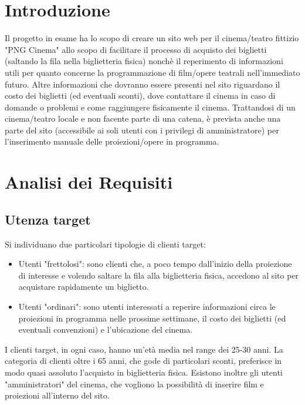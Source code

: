 \documentclass[a4paper, 12pt]{article}
\begin{document}
\makefrontpage
\tableofcontents
\clearpage

\section{Introduzione}
Il progetto in esame ha lo scopo di creare un sito web per il cinema/teatro fittizio "PNG Cinema" allo scopo di facilitare il processo di acquisto dei biglietti (saltando la fila nella biglietteria fisica) nonchè
il reperimento di informazioni utili per quanto concerne la programmazione di film/opere teatrali nell'immediato futuro.
Altre informazioni che dovranno essere presenti nel sito riguardano il costo dei biglietti (ed eventuali sconti), dove contattare il cinema in caso di domande o problemi e come raggiungere fisicamente il cinema.
Trattandosi di un cinema/teatro locale e non facente parte di una catena, è prevista anche una parte del sito (accessibile ai soli utenti con i privilegi di amministratore) per l'inserimento manuale delle proiezioni/opere in programma.

\section{Analisi dei Requisiti}
\subsection{Utenza target}
Si individuano due particolari tipologie di clienti target:
\begin{itemize}
    \item Utenti "frettolosi": sono clienti che, a poco tempo dall'inizio della proiezione di interesse e volendo saltare la fila alla biglietteria fisica, accedono al sito per acquistare rapidamente un biglietto.
    \\\item Utenti "ordinari": sono utenti interessati a reperire informazioni circa le proiezioni in programma nelle prossime settimane, il costo dei biglietti (ed eventuali convenzioni) e l'ubicazione del cinema.
\end{itemize}
I clienti target, in ogni caso, hanno un'età media nel range dei 25-30 anni. La categoria di clienti oltre i 65 anni, che gode di particolari sconti, preferisce in modo quasi assoluto l'acquisto in biglietteria fisica.
Esistono inoltre gli utenti "amministratori" del cinema, che vogliono la possibilità di inserire film e proiezioni all'interno del sito.
\end{document}
